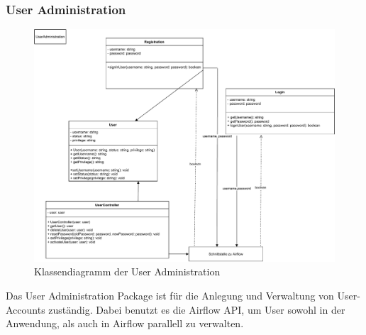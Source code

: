 \subsubsection{User Administration}
\begin{figure}[h!]
    \includegraphics[width=1\textwidth]{res/UserAdministration.pdf}
    \caption{Klassendiagramm der User Administration}
\end{figure}
\FloatBarrier
Das User Administration Package ist für die Anlegung und Verwaltung von User-Accounts zuständig.
Dabei benutzt es die Airflow API, um User sowohl in der Anwendung, als auch in Airflow parallell zu verwalten.

\FloatBarrier
\newpage

